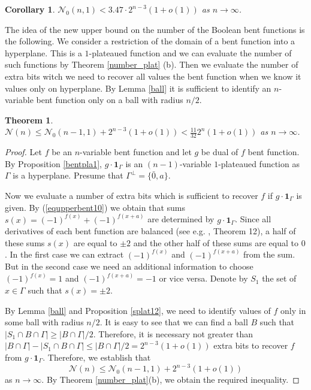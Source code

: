 \documentclass[a4paper,12pt]{article}   %
\newtheorem{theorem}{Theorem}
\newtheorem{corollary}{Corollary}
\begin{document}
\begin{corollary}\label{corplat100}
$\mathcal{N}_0(n,1)< 3.47\cdot2^{n-3}(1+o(1))$ as
$n\rightarrow\infty$.
\end{corollary}

The idea of the new upper bound on the number of the Boolean bent
functions is the  following. We consider a restriction of the domain
of a bent function into a hyperplane. This is a  $1$-plateaued
function and we can evaluate the number of such functions by Theorem
\ref{number_plat} (b). Then we evaluate the number of extra bits
witch we need to recover all values the bent function when we know
it values only on hyperplane. By Lemma \ref{ball} it is sufficient
to identify an $n$-variable bent function only on a ball with radius
$n/2$.

\begin{theorem}\label{number_bent}
$\mathcal{N}(n)\leq \mathcal{N}_0(n-1,1)+2^{n-3}(1+o(1))<
\frac{11}{32}2^n(1+o(1))$ as $n\rightarrow\infty$.
\end{theorem}
\begin{proof}
Let $f$ be an $n$-variable bent function and let $g$ be  dual of $f$
bent function. By Proposition \ref{bentpla1},
$g\cdot\mathbf{1}_\Gamma$ is an $(n-1)$-variable $1$-plateaued
function as  $\Gamma$ is a hyperplane. Presume that
$\Gamma^\perp=\{\bar{ 0}, a\}$.

Now we evaluate a number of extra bits which is sufficient  to
recover $f$ if $g\cdot\mathbf{1}_\Gamma$ is given. By
(\ref{equpperbent10}) we obtain that  sums
$s(x)=(-1)^{f(x)}+(-1)^{f(x+a)}$ are determined by
$g\cdot\mathbf{1}_\Gamma$. Since all derivatives of each bent
function are balanced (see e.g. \cite{Carlet}, Theorem 12), a half
of these sums $s(x)$ are equal to $\pm 2$ and the other half of
these sums are equal to $0$. In the first case we can extract
$(-1)^{f(x)}$ and $(-1)^{f(x+a)}$ from the sum. But in the second
case we need an additional  information to choose $(-1)^{f(x)}=1$
and $(-1)^{f(x+a)}=-1$ or vice versa. Denote by $S_1$ the set of
$x\in \Gamma$ such that $s(x)=\pm 2$.

By Lemma \ref{ball} and Proposition \ref{splat12}, we need to
identify values of $f$ only in some ball with radius $n/2$. It is
easy to see that we can  find a ball $B$ such that $|S_1\cap B\cap
\Gamma|\geq |B\cap \Gamma|/2$. Therefore, it is necessary not
greater than $|B\cap \Gamma|-|S_1\cap B\cap \Gamma| \leq |B\cap
\Gamma|/2=2^{n-3}(1+o(1))$ extra bits to recover $f$ from
$g\cdot\mathbf{1}_\Gamma$. Therefore, we establish that
$$\mathcal{N}(n)\leq \mathcal{N}_0(n-1,1)+2^{n-3}(1+o(1))$$ as
$n\rightarrow\infty$. By Theorem \ref{number_plat}(b), we obtain the
required inequality.
\end{proof}
\end{document}
